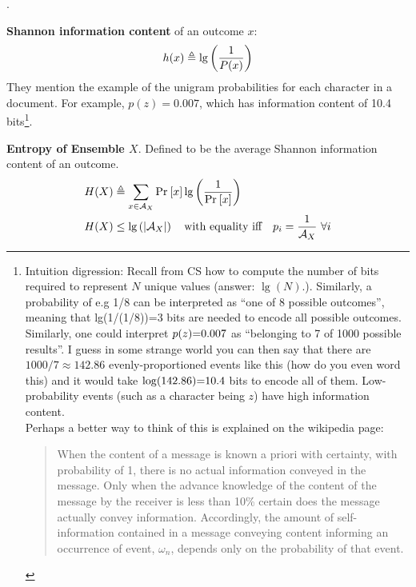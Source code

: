 \documentclass[11pt]{article}
\begin{document}
\myspace
\p {}.
\begin{compactitem}[-]
	\item \textbf{Shannon information content} of an outcome $x$:
	\begin{align}
		h(x) \triangleq \lg \left( \frac{1}{P(x)} \right)
	\end{align}
	They  mention the example of the unigram probabilities for each character in a document. For example, $p(z)=0.007$, which has information content of 10.4 bits\footnote{Intuition digression: Recall from CS how to compute the number of bits required to represent $N$ unique values (answer: $\lg(N)$.). Similarly, a probability of e.g 1/8 can be interpreted as ``one of 8 possible outcomes'', meaning that lg(1/(1/8))=3 bits are needed to encode all possible outcomes. Similarly, one could interpret $p(z){=} 0.007$ as ``belonging to 7 of 1000 possible results''. I guess in some strange world you can then say that there are $1000/7\approx 142.86$ evenly-proportioned events like this (how do you even word this) and it would take $\log(142.86){=} 10.4$ bits to encode all of them. Low-probability events (such as a character being $z$) have high information content.\\
	
	Perhaps a better way to think of this is explained on the wikipedia page:
	\begin{quote}
		When the content of a message is known a priori with certainty, with probability of 1, there is no actual information conveyed in the message. Only when the advance knowledge of the content of the message by the receiver is less than 10\% certain does the message actually convey information. Accordingly, the amount of self-information contained in a message conveying content informing an occurrence of event, $\omega_n$, depends only on the probability of that event.
\end{quote} }.
	
	\item \textbf{Entropy of Ensemble $X$}. Defined to be the average Shannon information content of an outcome.
	\begin{align}
		H(X) &\triangleq \sum_{x \in \mathcal{A}_X} \text{Pr}_{}\left[x\right]  \lg \left( \frac{1}{\text{Pr}_{}\left[x\right]} \right) \\
		H(X) &\le \lg \left( |\mathcal{A}_X| \right) \quad \text{with equality iff} \quad  p_i = \frac{1}{\mathcal{A}_X} ~  \forall i
	\end{align}
	

\end{compactitem}
\end{document}
